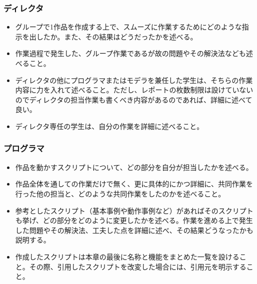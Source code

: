 \documentclass[12pt, xelatex,ja=standard,jafont=hiragino]{bxjsarticle}
\begin{document}
\subsubsection{ディレクタ}
\begin{itemize}
    \item グループで1作品を作成する上で、スムーズに作業するためにどのような指示を出したか。また、その結果はどうだったかを述べる。
    \item 作業過程で発生した、グループ作業であるが故の問題やその解決法なども述べること。
    \item ディレクタの他にプログラマまたはモデラを兼任した学生は、そちらの作業内容に力を入れて述べること。ただし、レポートの枚数制限は設けていないのでディレクタの担当作業も書くべき内容があるのであれば、詳細に述べて良い。
    \item ディレクタ専任の学生は、自分の作業を詳細に述べること。
\end{itemize}

\subsubsection{プログラマ}
\begin{itemize}
    \item 作品を動かすスクリプトについて、どの部分を自分が担当したかを述べる。
    \item 作品全体を通しての作業だけで無く、更に具体的にかつ詳細に、共同作業を行った他の担当と、どのような共同作業をしたのかを述べること。
    \item 参考としたスクリプト（基本事例や動作事例など）があればそのスクリプトも挙げ、どの部分をどのように変更したかを述べる。作業を進める上で発生した問題やその解決法、工夫した点を詳細に述べ、その結果どうなったかも説明する。
    \item 作成したスクリプトは本章の最後に名称と機能をまとめた一覧を設けること。その際、引用したスクリプトを改変した場合には、引用元を明示すること。
\end{itemize}
\end{document}
